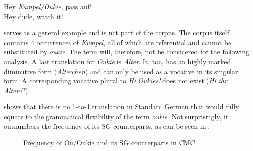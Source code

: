 \documentclass[output=paper]{langsci/langscibook}
\begin{document}
\ea
\label{ex:radke:20}
	Hey \textit{Kumpel/Oukie}, pass auf!\\
 	Hey dude, watch it! \\
\z


 serves as a general example and is not part of the corpus. The corpus itself contains 4 occurrences of \textit{Kumpel}, all of which are  referential and cannot be substituted by \textit{oukie}. The term will, therefore,  not be considered for the following analysis. A last translation for \textit{Oukie} is \textit{Alter}. It, too, has an highly marked diminutive form (\textit{Alterchen}) and can only be used as a vocative in its singular form. A corresponding vocative plural to \textit{Hi} \textit{Oukies!} does not exist (\textit{Hi} \textit{ihr} \textit{Alten!*}).

 shows that there is no 1-to-1 translation in Standard German that would fully equate to the grammatical flexibility of the term \textit{oukie}. Not surprisingly, it outnumbers the frequency of its SG counterparts, as can be seen in .

  
 

  \begin{figure}
\caption{Frequency of {Ou/Oukie} and its SG counterparts in CMC\label{fig:radke:4}}
\end{figure}  
\end{document}

